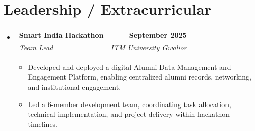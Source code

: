 \documentclass[letterpaper,11pt]{article}
\makeatletter
\newcommand{\resumeItem}[1]{
  \item\small{
    {#1 \vspace{-2pt}}
  }
}
\newcommand{\resumeSubheading}[4]{
  \vspace{-2pt}\item
    \begin{tabular*}{1.0\textwidth}[t]{l@{\extracolsep{\fill}}r}
      {\fontsize{12pt}{14pt}\selectfont\bfseries #1} &
      {\fontsize{12pt}{14pt}\selectfont\bfseries\sffamily #2} \\
      {\fontsize{10pt}{12pt}\selectfont\itshape #3} &
      {\fontsize{10pt}{12pt}\selectfont\itshape #4} \\
    \end{tabular*}\vspace{-7pt}
}
\newcommand{\resumeSubHeadingListStart}{\begin{itemize}[leftmargin=0.0in, label={}]}
\newcommand{\resumeSubHeadingListEnd}{\end{itemize}}
\newcommand{\resumeItemListStart}{\begin{itemize}}
\newcommand{\resumeItemListEnd}{\end{itemize}\vspace{-5pt}}
\makeatother
\begin{document}
%



\section{Leadership / Extracurricular}
    \resumeSubHeadingListStart
        \resumeSubheading{Smart India Hackathon}{September 2025}{Team Lead}{ITM University Gwalior}
            \resumeItemListStart
                \resumeItem{Developed and deployed a digital Alumni Data Management and Engagement Platform, enabling centralized alumni records, networking, and institutional engagement.}
                \resumeItem{Led a 6-member development team, coordinating task allocation, technical implementation, and project delivery within hackathon timelines.}
            \resumeItemListEnd
        
    \resumeSubHeadingListEnd
\end{document}
